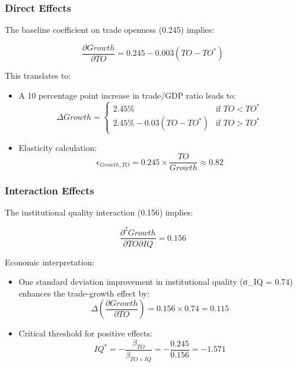 \documentclass[12pt,a4paper]{article}
\theoremstyle{definition}
\begin{document}
\subsubsection{Direct Effects}
The baseline coefficient on trade openness (0.245) implies:

\begin{equation}
\frac{\partial Growth}{\partial TO} = 0.245 - 0.003(TO - TO^*)
\end{equation}

This translates to:
\begin{itemize}
    \item A 10 percentage point increase in trade/GDP ratio leads to:
    \begin{equation}
    \Delta Growth = \begin{cases}
    2.45\% & \text{if } TO < TO^* \\
    2.45\% - 0.03(TO - TO^*) & \text{if } TO > TO^*
    \end{cases}
    \end{equation}

    \item Elasticity calculation:
    \begin{equation}
    \epsilon_{Growth,TO} = 0.245 \times \frac{TO}{Growth} \approx 0.82
    \end{equation}
\end{itemize}

\subsubsection{Interaction Effects}
The institutional quality interaction (0.156) implies:

\begin{equation}
\frac{\partial^2 Growth}{\partial TO \partial IQ} = 0.156
\end{equation}

Economic interpretation:
\begin{itemize}
    \item One standard deviation improvement in institutional quality (σ_{IQ} = 0.74) enhances the trade-growth effect by:
    \begin{equation}
    \Delta(\frac{\partial Growth}{\partial TO}) = 0.156 \times 0.74 = 0.115
    \end{equation}

    \item Critical threshold for positive effects:
    \begin{equation}
    IQ^* = -\frac{\beta_{TO}}{\beta_{TO \times IQ}} = -\frac{0.245}{0.156} = -1.571
    \end{equation}
\end{itemize}
\end{document}

